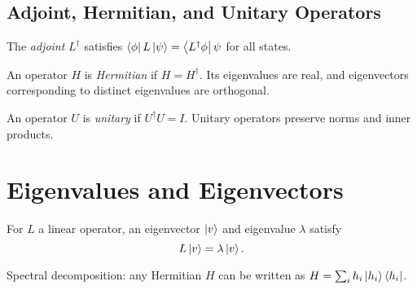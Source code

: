 %
%

\subsection{Adjoint, Hermitian, and Unitary Operators}
\begin{definition}[Adjoint]
	The \emph{adjoint} $L^\dagger$ satisfies $\bra{\phi}L\ket{\psi}=\bra{L^\dagger\phi}\psi$ for all states.
\end{definition}

\begin{definition}
	An operator $H$ is \emph{Hermitian} if $H=H^\dagger$. Its eigenvalues are real, and eigenvectors corresponding to distinct eigenvalues are orthogonal.
\end{definition}

\begin{definition}
	An operator $U$ is \emph{unitary} if $U^\dagger U=I$. Unitary operators preserve norms and inner products.
\end{definition}

\section{Eigenvalues and Eigenvectors}
\begin{definition}
	For $L$ a linear operator, an eigenvector $\ket{v}$ and eigenvalue $\lambda$ satisfy
	\[L\ket{v}=\lambda\ket{v}.\]
\end{definition}
Spectral decomposition: any Hermitian $H$ can be written as $H=\sum_i h_i\ket{h_i}\bra{h_i}$.

